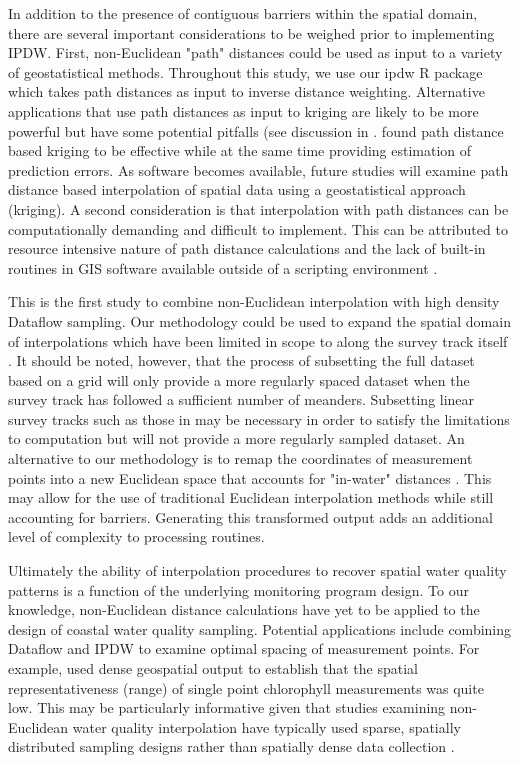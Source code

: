 \documentclass[shortnames,nofooter,noheadings]{jss}
\begin{document}
  In addition to the presence of contiguous barriers within the spatial domain, there are several important considerations to be weighed prior to implementing IPDW. First, non-Euclidean "path" distances could be used as input to a variety of geostatistical methods. Throughout this study, we use our ipdw R package which takes path distances as input to inverse distance weighting. Alternative applications that use path distances as input to kriging are likely to be more powerful but have some potential pitfalls (see discussion in \citep{lopez2009geostatistical}. \citet{lopez2009geostatistical} found path distance based kriging to be effective while at the same time providing estimation of prediction errors. As software becomes available, future studies will examine path distance based interpolation of spatial data using a geostatistical approach (kriging). A second consideration is that interpolation with path distances can be computationally demanding and difficult to implement. This can be attributed to resource intensive nature of path distance calculations and the lack of built-in routines in GIS software available outside of a scripting environment \citep{stachelek2014}. 

  This is the first study to combine non-Euclidean interpolation with high density Dataflow sampling. Our methodology could be used to expand the spatial domain of interpolations which have been limited in scope to along the survey track itself \citep{morse2011environmental, soderqvist2010seasonal, xie2013geographically}. It should be noted, however, that the process of subsetting the full dataset based on a grid will only provide a more regularly spaced dataset when the survey track has followed a sufficient number of meanders. Subsetting linear survey tracks such as those in \cite{buzzelli2014fine} may be necessary in order to satisfy the limitations to computation but will not provide a more regularly sampled dataset. An alternative to our methodology is to remap the coordinates of measurement points into a new Euclidean space that accounts for "in-water" distances \citep{loland2003spatial}. This may allow for the use of traditional Euclidean interpolation methods while still accounting for barriers. Generating this transformed output adds an additional level of complexity to processing routines. 

  Ultimately the ability of interpolation procedures to recover spatial water quality patterns is a function of the underlying monitoring program design. To our knowledge, non-Euclidean distance calculations have yet to be applied to the design of coastal water quality sampling. Potential applications include combining Dataflow and IPDW to examine optimal spacing of measurement points. For example, \cite{anttila2008feasible} used dense geospatial output to establish that the spatial representativeness (range) of single point chlorophyll measurements was quite low. This may be particularly informative given that studies examining non-Euclidean water quality interpolation have typically used sparse, spatially distributed sampling designs rather than spatially dense data collection \citep{greenberg2011least, suominen2010surface}. 
\end{document}
